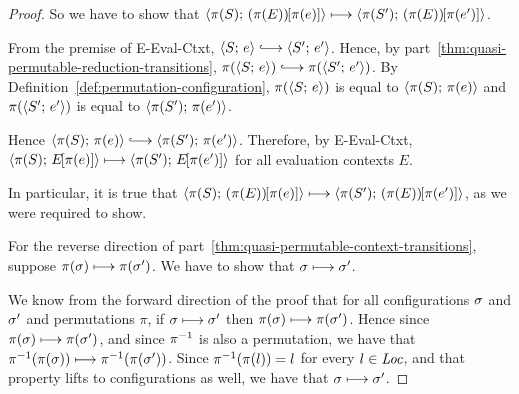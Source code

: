 \begin{proof}
  So we have to show that
  $\langle \pi(S);\, (\pi(E))\hspace{-1mm}\left[\pi(e)\right] \rangle \longmapsto
  \langle \pi(S');\, (\pi(E))\hspace{-1mm}\left[\pi(e')\right] \rangle$.

  From the premise of {\sc E-Eval-Ctxt}, $\config{S}{e} \parstepsto
  \config{S'}{e'}$.  Hence, by
  part~\ref{thm:quasi-permutable-reduction-transitions},
  $\pi(\config{S}{e}) \parstepsto \pi(\config{S'}{e'})$.  By
  Definition~\ref{def:permutation-configuration}, $\pi(\langle S;\, e \rangle)$
  is equal to $\langle \pi(S);\, \pi(e) \rangle$ and $\pi(\langle S';\, e' \rangle)$ is
  equal to $\langle \pi(S');\, \pi(e') \rangle$.

  Hence $\config{\pi(S)}{\pi(e)} \parstepsto
  \config{\pi(S')}{\pi(e')}$.  Therefore, by {\sc E-Eval-Ctxt},
  $\langle \pi(S);\, E\hspace{-1mm}\left[\pi(e)\right] \rangle \longmapsto
  \langle \pi(S');\, E\hspace{-1mm}\left[\pi(e')\right] \rangle$ for all evaluation contexts $E$.

  In particular, it is true that
  $\langle \pi(S);\, (\pi(E))\hspace{-1mm}\left[\pi(e)\right] \rangle \longmapsto
  \langle \pi(S');\, (\pi(E))\hspace{-1mm}\left[\pi(e')\right] \rangle$, as we were required
  to show.

  For the reverse direction of
  part~\ref{thm:quasi-permutable-context-transitions}, suppose
  $\pi(\sigma) \longmapsto \pi(\sigma')$.  We have to show that $\sigma
  \longmapsto \sigma'$.

  We know from the forward direction of the proof that for all
  configurations $\sigma$ and $\sigma'$ and permutations $\pi$, if
  $\sigma \longmapsto \sigma'$ then $\pi(\sigma) \longmapsto
  \pi(\sigma')$.  Hence since $\pi(\sigma) \longmapsto \pi(\sigma')$, and
  since $\pi^{-1}$ is also a permutation, we have that
  $\pi^{-1}(\pi(\sigma)) \longmapsto \pi^{-1}(\pi(\sigma'))$.  Since
  $\pi^{-1}(\pi(l)) = l$ for every $l \in \mathit{Loc}$, and that property lifts
  to configurations as well, we have that $\sigma \longmapsto \sigma'$.

\end{proof}
